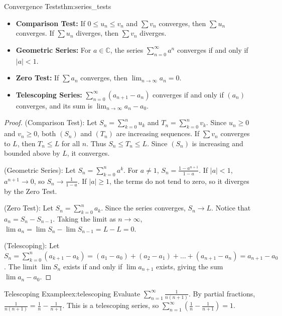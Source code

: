 \documentclass[11pt, a4paper]{article}
\begin{document}
\begin{theorem}{Convergence Tests}{thm:series_tests}
\begin{itemize}
    \item \textbf{Comparison Test:} If $0 \le u_n \le v_n$ and $\sum v_n$ converges, then $\sum u_n$ converges. If $\sum u_n$ diverges, then $\sum v_n$ diverges.
    \item \textbf{Geometric Series:} For $a \in \mathbb{C}$, the series $\sum_{n=0}^\infty a^n$ converges if and only if $|a| < 1$.
    \item \textbf{Zero Test:} If $\sum a_n$ converges, then $\lim_{n \to \infty} a_n = 0$.
    \item \textbf{Telescoping Series:} $\sum_{n=0}^\infty (a_{n+1} - a_n)$ converges if and only if $(a_n)$ converges, and its sum is $\lim_{n \to \infty} a_n - a_0$.
\end{itemize}
\end{theorem}
\begin{proof}
(Comparison Test): Let $S_n = \sum_{k=0}^n u_k$ and $T_n = \sum_{k=0}^n v_k$. Since $u_n \ge 0$ and $v_n \ge 0$, both $(S_n)$ and $(T_n)$ are increasing sequences. If $\sum v_n$ converges to $L$, then $T_n \le L$ for all $n$. Thus $S_n \le T_n \le L$. Since $(S_n)$ is increasing and bounded above by $L$, it converges.

(Geometric Series): Let $S_n = \sum_{k=0}^n a^k$. For $a \neq 1$, $S_n = \frac{1 - a^{n+1}}{1 - a}$. If $|a| < 1$, $a^{n+1} \to 0$, so $S_n \to \frac{1}{1-a}$. If $|a| \ge 1$, the terms do not tend to zero, so it diverges by the Zero Test.

(Zero Test): Let $S_n = \sum_{k=0}^n a_k$. Since the series converges, $S_n \to L$. Notice that $a_n = S_n - S_{n-1}$. Taking the limit as $n \to \infty$, $\lim a_n = \lim S_n - \lim S_{n-1} = L - L = 0$.

(Telescoping): Let $S_n = \sum_{k=0}^n (a_{k+1} - a_k) = (a_1 - a_0) + (a_2 - a_1) + \dots + (a_{n+1} - a_n) = a_{n+1} - a_0$. The limit $\lim S_n$ exists if and only if $\lim a_{n+1}$ exists, giving the sum $\lim a_n - a_0$.
\end{proof}

\begin{example}{Telescoping Example}{ex:telescoping}
Evaluate $\sum_{n=1}^\infty \frac{1}{n(n+1)}$. By partial fractions, $\frac{1}{n(n+1)} = \frac{1}{n} - \frac{1}{n+1}$.
This is a telescoping series, so $\sum_{n=1}^\infty \left( \frac{1}{n} - \frac{1}{n+1} \right) = 1$.
\end{example}
\end{document}

